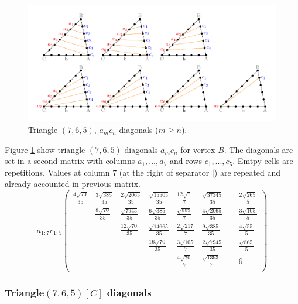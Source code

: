 \documentclass[11pt]{article}
\begin{document}
\begin{figure}[htp]
\centering
\includegraphics[scale=1]{t765ac}
\caption{Triangle $(7,6,5)$, $a_mc_n$ diagonals ($m \ge n$).}
\label{t765ac}
\end{figure}
Figure \ref{t765ac} show triangle $(7,6,5)$ diagonals $a_mc_n$ for vertex $B$. 
The diagonals are set in a second matrix with columns $a_1,...,a_7$ and rows $c_1,...,c_5$. Emtpy cells are repetitions.
Values at column 7 (at the right of separator $|$) are repeated and already accounted in previous matrix.
\begin{equation}\label{eq:appendrow}
a_{1:7}c_{1:5}\left(\begin{array}{cccccccc}
	\frac{4\sqrt{70}}{35} & \frac{3\sqrt{385}}{35} & \frac{2\sqrt{2065}}{35} & \frac{\sqrt{15505}}{35} & \frac{12\sqrt{7}}{7} & \frac{\sqrt{37345}}{35} & | & \frac{2\sqrt{265}}{5}\\
	& \frac{8\sqrt{70}}{35} & \frac{\sqrt{7945}}{35} & \frac{6\sqrt{385}}{35} & \frac{\sqrt{889}}{7} & \frac{4\sqrt{2065}}{35} & | & \frac{3\sqrt{105}}{5} \\
	& & \frac{12\sqrt{70}}{35} & \frac{\sqrt{14665}}{35} & \frac{2\sqrt{217}}{7} & \frac{9\sqrt{385}}{35} & | & \frac{4\sqrt{55}}{5}\\
	& & & \frac{16\sqrt{70}}{35} & \frac{3\sqrt{105}}{7} & \frac{2\sqrt{7945}}{35} & | & \frac{\sqrt{865}}{5}\\
	& & & & \frac{4\sqrt{70}}{7} & \frac{\sqrt{1393}}{7} & | & \boxed{6}\\
\end{array}\right)
\end{equation}

\subsubsection{Triangle$(7,6,5)[C]$ diagonals}
\end{document}

